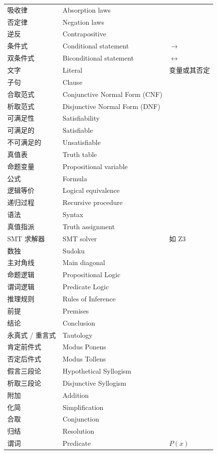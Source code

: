 \documentclass[UTF8,11pt,a4paper]{ctexbook}   %
\theoremstyle{definition}
\begin{document}
\begin{longtable}{|p{4.8cm}|p{4.8cm}|p{4.8cm}|}
吸收律 & Absorption laws & \\
否定律 & Negation laws & \\
逆反 & Contrapositive & \\
条件式 & Conditional statement & $\to$ \\
双条件式 & Biconditional statement & $\leftrightarrow$ \\
文字 & Literal & 变量或其否定 \\
子句 & Clause & \\
合取范式 & Conjunctive Normal Form (CNF) & \\
析取范式 & Disjunctive Normal Form (DNF) & \\
可满足性 & Satisfiability & \\
可满足的 & Satisfiable & \\
不可满足的 & Unsatisfiable & \\
真值表 & Truth table & \\
命题变量 & Propositional variable & \\
公式 & Formula & \\
逻辑等价 & Logical equivalence & \\
递归过程 & Recursive procedure & \\
语法 & Syntax & \\
真值指派 & Truth assignment & \\
SMT 求解器 & SMT solver & 如 Z3 \\
数独 & Sudoku & \\
主对角线 & Main diagonal & \\ \hline
命题逻辑 & Propositional Logic & \\
谓词逻辑 & Predicate Logic & \\
推理规则 & Rules of Inference & \\
前提 & Premises & \\
结论 & Conclusion & \\
永真式 / 重言式 & Tautology & \\
肯定前件式 & Modus Ponens & \\
否定后件式 & Modus Tollens & \\
假言三段论 & Hypothetical Syllogism & \\
析取三段论 & Disjunctive Syllogism & \\
附加 & Addition & \\
化简 & Simplification & \\
合取 & Conjunction & \\
归结 & Resolution & \\
谓词 & Predicate & $P(x)$ \\

\end{longtable}
\end{document}
